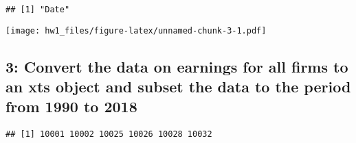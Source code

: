 \documentclass[
]{article}
\newenvironment{Shaded}{\begin{snugshade}}{\end{snugshade}}
\newcommand{\AttributeTok}[1]{\textcolor[rgb]{0.13,0.29,0.53}{#1}}
\newcommand{\CommentTok}[1]{\textcolor[rgb]{0.56,0.35,0.01}{\textit{#1}}}
\newcommand{\FunctionTok}[1]{\textcolor[rgb]{0.13,0.29,0.53}{\textbf{#1}}}
\newcommand{\NormalTok}[1]{#1}
\newcommand{\OtherTok}[1]{\textcolor[rgb]{0.56,0.35,0.01}{#1}}
\newcommand{\SpecialCharTok}[1]{\textcolor[rgb]{0.81,0.36,0.00}{\textbf{#1}}}
\newcommand{\StringTok}[1]{\textcolor[rgb]{0.31,0.60,0.02}{#1}}
\begin{document}
\begin{Shaded}
\end{Shaded}

\begin{verbatim}
## [1] "Date"
\end{verbatim}

\begin{Shaded}
\end{Shaded}

\texttt{[image: hw1\_files/figure-latex/unnamed-chunk-3-1.pdf]}

\subsection{3: Convert the data on earnings for all firms to an xts
object and subset the data to the period from 1990 to
2018}\label{convert-the-data-on-earnings-for-all-firms-to-an-xts-object-and-subset-the-data-to-the-period-from-1990-to-2018}

\begin{Shaded}
\end{Shaded}

\begin{verbatim}
## [1] 10001 10002 10025 10026 10028 10032
\end{verbatim}
\end{document}
